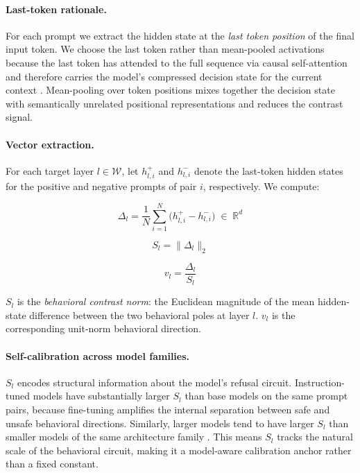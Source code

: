 \documentclass[10pt]{article}
\begin{document}
\paragraph{Last-token rationale.}
For each prompt we extract the hidden state at the \emph{last token position}
of the final input token.  We choose the last token rather than mean-pooled
activations because the last token has attended to the full sequence via
causal self-attention and therefore carries the model's compressed decision state
for the current context \citep{rimsky2023steering}.  Mean-pooling over token
positions mixes together the decision state with semantically unrelated
positional representations and reduces the contrast signal.

\paragraph{Vector extraction.}
For each target layer $l \in \mathcal{W}$, let $h^+_{l,i}$ and $h^-_{l,i}$
denote the last-token hidden states for the positive and negative prompts of
pair $i$, respectively.  We compute:

\begin{equation}
  \Delta_l = \frac{1}{N}\sum_{i=1}^{N}\bigl(h^+_{l,i} - h^-_{l,i}\bigr)
  \;\in\; \mathbb{R}^d
  \label{eq:meandiff}
\end{equation}

\begin{equation}
  S_l = \|\Delta_l\|_2
  \label{eq:Sl}
\end{equation}

\begin{equation}
  v_l = \frac{\Delta_l}{S_l}
  \label{eq:vl}
\end{equation}

$S_l$ is the \emph{behavioral contrast norm}: the Euclidean magnitude of the
mean hidden-state difference between the two behavioral poles at layer $l$.
$v_l$ is the corresponding unit-norm behavioral direction.

\paragraph{Self-calibration across model families.}
$S_l$ encodes structural information about the model's refusal circuit.
Instruction-tuned models have substantially larger $S_l$ than base models on
the same prompt pairs, because fine-tuning amplifies the internal separation
between safe and unsafe behavioral directions.  Similarly, larger models tend
to have larger $S_l$ than smaller models of the same architecture family
\citep{chen2025persona}.  This means $S_l$ tracks the natural scale of the
behavioral circuit, making it a model-aware calibration anchor rather than a
fixed constant.
\end{document}
